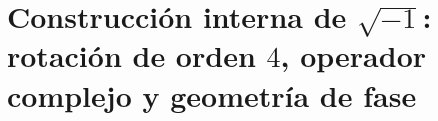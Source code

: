 \chapter{Construcción interna de \(\sqrt{-1}\): rotación de orden \(4\), operador complejo y geometría de fase}
\label{chap:p3-final:32:raiz_menos_uno}

